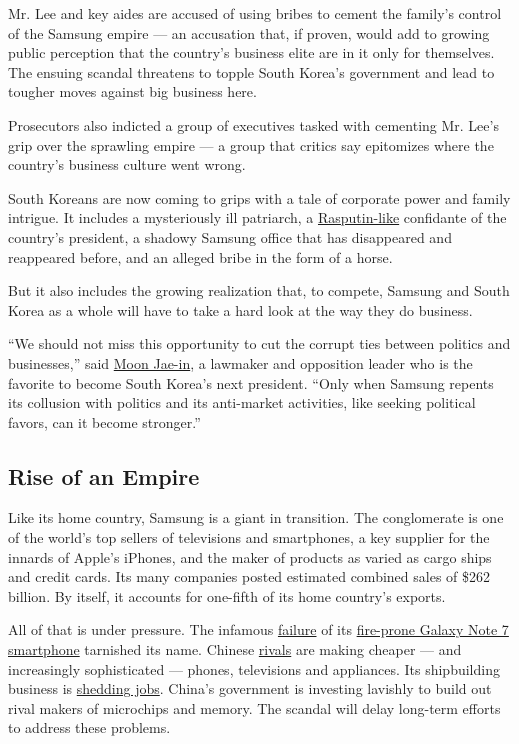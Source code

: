 Mr. Lee and key aides are accused of using bribes to cement the family's
control of the Samsung empire --- an accusation that, if proven, would
add to growing public perception that the country's business elite are
in it only for themselves. The ensuing scandal threatens to topple South
Korea's government and lead to tougher moves against big business here.

Prosecutors also indicted a group of executives tasked with cementing
Mr. Lee's grip over the sprawling empire --- a group that critics say
epitomizes where the country's business culture went wrong.

South Koreans are now coming to grips with a tale of corporate power and
family intrigue. It includes a mysteriously ill patriarch, a
\href{https://www.nytimes.com/2016/11/01/world/asia/south-korea-park-geun-hye-choi-soon-sil.html}{Rasputin-like}
confidante of the country's president, a shadowy Samsung office that has
disappeared and reappeared before, and an alleged bribe in the form of a
horse.

But it also includes the growing realization that, to compete, Samsung
and South Korea as a whole will have to take a hard look at the way they
do business.

``We should not miss this opportunity to cut the corrupt ties between
politics and businesses,'' said
\href{https://www.nytimes.com/2016/12/09/world/asia/south-korea-who-could-replace-park.html}{Moon
Jae-in}, a lawmaker and opposition leader who is the favorite to become
South Korea's next president. ``Only when Samsung repents its collusion
with politics and its anti-market activities, like seeking political
favors, can it become stronger.''

\hypertarget{rise-of-an-empire}{%
\subsection{Rise of an Empire}\label{rise-of-an-empire}}

Like its home country, Samsung is a giant in transition. The
conglomerate is one of the world's top sellers of televisions and
smartphones, a key supplier for the innards of Apple's iPhones, and the
maker of products as varied as cargo ships and credit cards. Its many
companies posted estimated combined sales of \$262 billion. By itself,
it accounts for one-fifth of its home country's exports.

All of that is under pressure. The infamous
\href{https://www.nytimes.com/2016/10/12/business/international/samsung-galaxy-note7-terminated.html}{failure}
of its
\href{https://www.nytimes.com/2017/01/23/business/samsung-galaxy-note7-fires.html}{fire-prone
Galaxy Note 7 smartphone} tarnished its name. Chinese
\href{https://www.nytimes.com/2016/10/19/business/samsung-galaxy-note7-china-test.html}{rivals}
are making cheaper --- and increasingly sophisticated --- phones,
televisions and appliances. Its shipbuilding business is
\href{http://english.yonhapnews.co.kr/news/2017/01/12/0200000000AEN20170112002500320.html}{shedding
jobs}. China's government is investing lavishly to build out rival
makers of microchips and memory. The scandal will delay long-term
efforts to address these problems.

